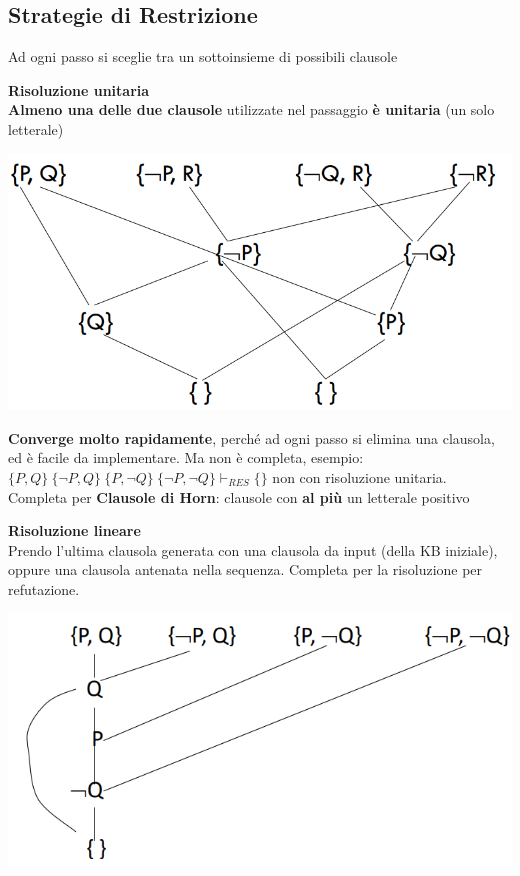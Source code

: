 \documentclass[10pt]{book}
\begin{document}
\subsection{Strategie di Restrizione}
Ad ogni passo si sceglie tra un sottoinsieme di possibili clausole
\begin{list}{}{}
	\item \textbf{Risoluzione unitaria}\\
	\textbf{Almeno una delle due clausole} utilizzate nel passaggio \textbf{è unitaria} (un solo letterale)
	\begin{center}
		\includegraphics[scale=0.5]{risunit.png}
	\end{center}
	\textbf{Converge molto rapidamente}, perché ad ogni passo si elimina una clausola, ed è facile da implementare. Ma non è completa, esempio: $\{P, Q\}\:\{\neg P, Q\}\:\{P, \neg Q\}\:\{\neg P, \neg Q\} \vdash_{RES} \{\}$ non con risoluzione unitaria.\\
	Completa per \textbf{Clausole di Horn}: clausole con \textbf{al più} un letterale positivo
	\item \textbf{Risoluzione lineare}\\
	Prendo l'ultima clausola generata con una clausola da input (della KB iniziale), oppure una clausola antenata nella sequenza. Completa per la risoluzione per refutazione.
	\begin{center}
		\includegraphics[scale=0.5]{rislin.png}

\end{center}
\end{list}
\end{document}
